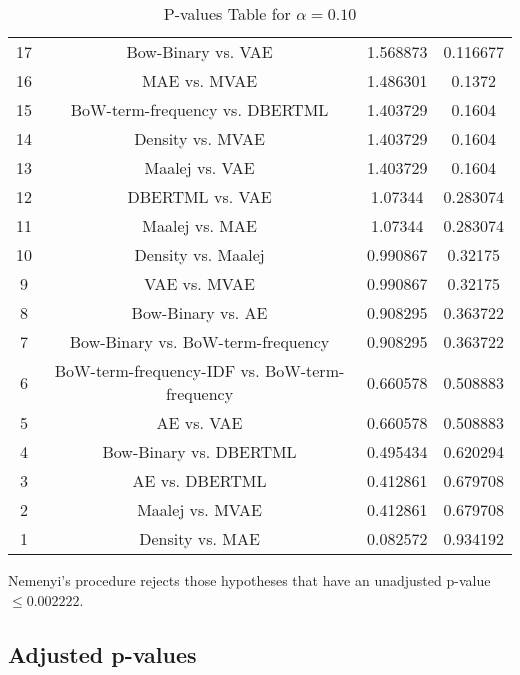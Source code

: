 \documentclass[a4paper,10pt]{article}
\begin{document}
\begin{landscape}
\begin{table}[!htp]
\begin{tabular}{cccc}
17&Bow-Binary vs. VAE&1.568873&0.116677\\
16&MAE vs. MVAE&1.486301&0.1372\\
15&BoW-term-frequency vs. DBERTML&1.403729&0.1604\\
14&Density vs. MVAE&1.403729&0.1604\\
13&Maalej vs. VAE&1.403729&0.1604\\
12&DBERTML vs. VAE&1.07344&0.283074\\
11&Maalej vs. MAE&1.07344&0.283074\\
10&Density vs. Maalej&0.990867&0.32175\\
9&VAE vs. MVAE&0.990867&0.32175\\
8&Bow-Binary vs. AE&0.908295&0.363722\\
7&Bow-Binary vs. BoW-term-frequency&0.908295&0.363722\\
6&BoW-term-frequency-IDF vs. BoW-term-frequency&0.660578&0.508883\\
5&AE vs. VAE&0.660578&0.508883\\
4&Bow-Binary vs. DBERTML&0.495434&0.620294\\
3&AE vs. DBERTML&0.412861&0.679708\\
2&Maalej vs. MVAE&0.412861&0.679708\\
1&Density vs. MAE&0.082572&0.934192\\
\hline
\end{tabular}
\caption{P-values Table for $\alpha=0.10$}
\end{table}Nemenyi's procedure rejects those hypotheses that have an unadjusted p-value $\le0.002222$.

\pagebreak

\subsection{Adjusted p-values}


\end{landscape}
\end{document}
